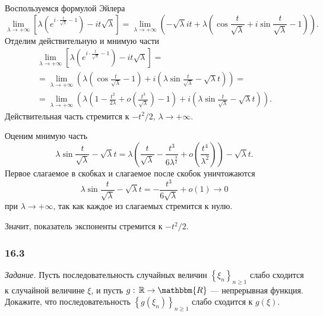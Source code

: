 Воспользуемся формулой Эйлера
$$ \lim \limits_{ \lambda \to + \infty }
\left[
  \lambda \left( e^{i \cdot \frac{t}{ \sqrt{ \lambda }} - 1} \right) - it \sqrt{ \lambda }
\right] =
\lim \limits_{ \lambda \to + \infty }
\left(
  - \sqrt{ \lambda } it +
  \lambda \left( \cos \frac{t}{ \sqrt{ \lambda }} +
  i \sin \frac{t}{ \sqrt{ \lambda }} -
  1
\right) \right).$$
Отделим действительную и мнимую части
\begin{equation*}
\begin{split}
\lim \limits_{ \lambda \to + \infty }
\left[
  \lambda \left( e^{i \cdot \frac{t}{ \sqrt{ \lambda }} - 1} \right) - it \sqrt{ \lambda }
\right] = \\
= \lim \limits_{ \lambda \to + \infty }
\left( \lambda \left( \cos \frac{t}{ \sqrt{ \lambda }} - 1 \right) +
i \left( \lambda \sin \frac{t}{ \sqrt{ \lambda }} - \sqrt{ \lambda } t \right) \right) = \\
= \lim \limits_{ \lambda \to + \infty }
\left( \lambda \left( 1 - \frac{t^2}{2 \lambda } +
o \left( \frac{t^3}{ \sqrt{ \lambda }} \right) - 1 \right) +
i \left( \lambda \sin \frac{t}{ \sqrt{ \lambda }} - \sqrt{ \lambda } t \right) \right).
\end{split}
\end{equation*}
Действительная часть стремится к $- t^2 / 2, \, \lambda \rightarrow + \infty $.

Оценим мнимую часть
$$ \lambda \sin \frac{t}{ \sqrt{ \lambda }} - \sqrt{ \lambda } t =
\lambda \left( \frac{t}{ \sqrt{ \lambda }} - \frac{t^3}{6 \lambda^{ \frac{3}{2}}} +
o \left( \frac{t^4}{ \lambda^2} \right) \right) - \sqrt{ \lambda } t.$$
Первое слагаемое в скобках и слагаемое после скобок уничтожаются
$$ \lambda \sin \frac{t}{ \sqrt{ \lambda }} - \sqrt{ \lambda } t =
- \frac{t^3}{6 \sqrt{ \lambda }} + o \left( 1 \right) \rightarrow 0 $$
при $ \lambda \rightarrow + \infty $, так как каждое из слагаемых стремится к нулю.

Значит, показатель экспоненты стремится к $- t^2 / 2$.

\subsubsection*{16.3}

\textit{Задание.}
Пусть последовательность случайных величин $ \left\{ \xi_n \right\}_{n \geq 1}$
слабо сходится к случайной величине $ \xi $,
и пусть $g: \, \mathbb{R} \rightarrow \mathbbm{R}$ --- непрерывная функция.
Докажите, что последовательность $ \left\{ g \left( \xi_n \right) \right\}_{n \geq 1}$
слабо сходится к $g \left( \xi \right) $.

